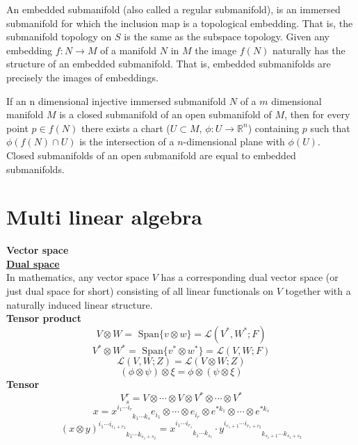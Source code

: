 \begin{newdef}
An embedded submanifold (also called a regular submanifold), is an immersed submanifold for which the inclusion map is a topological embedding. That is, the submanifold topology on $S$ is the same as the subspace topology. Given any embedding $f:N \to M$ of a manifold $N$ in $M$ the image $f(N)$ naturally has the structure of an embedded submanifold. That is, embedded submanifolds are precisely the images of embeddings.
\end{newdef}

\begin{newprop}[]
If an n dimensional injective immersed submanifold $N$ of a $m$ dimensional manifold $M$ is a closed submanifold of an open submanifold of $M$, then for every point $p \in f(N)$ there exists a chart ($U \subset M$, $\phi:U \to \mathbb{R}^n $) containing $p$ such that $\phi(f(N) \cap U)$ is the intersection of a $n$-dimensional plane with $\phi(U)$.\\
Closed submanifolds of an open submanifold are equal to embedded submanifolds.
\end{newprop}

\section{Multi linear algebra}
\begin{newdef}[Tensor]
\textbf{Vector space}\\
\href{https://en.wikipedia.org/wiki/Dual_space}{\textbf{Dual space}}\\
In mathematics, any vector space $V$ has a corresponding dual vector space (or just dual space for short) consisting of all linear functionals on $V$ together with a naturally induced linear structure.\\
\textbf{Tensor product}
\[V \otimes W = \mbox{ Span}\{ v \otimes w \} = \mathcal{L}(V^*,W^*;F)\]
\[V^* \otimes W^* = \mbox{ Span}\{ v^* \otimes w^* \} = \mathcal{L}(V,W;F)\]
\[\mathcal{L}(V,W;Z)=\mathcal{L}(V \otimes W;Z)\]
\[(\phi \otimes \psi)\otimes \xi = \phi \otimes (\psi \otimes \xi)\]
\textbf{Tensor}
\[V_s^r = V \otimes \cdots \otimes V \otimes V^* \otimes \cdots \otimes V^*\]
\[x=x^{i_1 \cdots i_r}_{\phantom{i_1 \cdots i_r} k_1 \cdots k_s} e_{i_1} \otimes \cdots \otimes e_{i_r} \otimes e^{*k_1} \otimes \cdots \otimes e^{*k_s}\]
\[(x \otimes y)^{i_1 \cdots i_{r_1+r_2}}_{\phantom{i_1 \cdots i_{r_1+r_2}} k_1 \cdots k_{s_1+s_2}} = 
x^{i_1 \cdots i_{r_1}}_{\phantom{i_1 \cdots i_{r_1}}k_1 \cdots k_{s_1}} \cdot y^{i_{r_1+1} \cdots i_{r_1+r_2}}_{\phantom{i_{r_1+1} \cdots i_{r_1+r_2}}k_{s_1+1} \cdots k_{s_1+s_2}}\]
\end{newdef}


